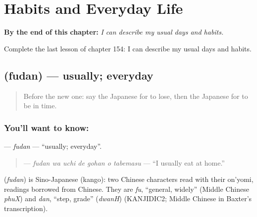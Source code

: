 
\chapter{Habits and Everyday Life}
\label{ch:ja-habits-and-everyday-life}

\begin{chapteropening}
\textbf{By the end of this chapter:} \emph{I can describe my usual days and habits.}

Complete the last lesson of chapter 154: I can describe my usual days and habits.
\end{chapteropening}

\section[\texorpdfstring{\ja{ふだん} (fudan)}{ふだん (fudan)}]{ (fudan) — usually; everyday}

\label{lesson:JA-C154-fudan}



\begin{quote}
Before the new one: say the Japanese for to lose, then the Japanese for to be in time.
\end{quote}

\subsection*{You'll want to know: }
\textbf{} — \emph{fudan} — \textquotedblleft{}usually; everyday\textquotedblright{}.

\begin{quote}
\textbf{   } — \emph{fudan wa uchi de gohan o tabemasu} — \textquotedblleft{}I usually eat at home.\textquotedblright{}
\end{quote}

\begin{cousinweb}
\textbf{} (\emph{fudan}) is Sino-Japanese (kango): two Chinese characters read with their on'yomi, readings borrowed from Chinese. They are \emph{fu}, \textquotedblleft{}general, widely\textquotedblright{} (Middle Chinese \emph{phuX}) and \emph{dan}, \textquotedblleft{}step, grade\textquotedblright{} (\emph{dwanH}) (KANJIDIC2; Middle Chinese in Baxter's transcription).
\end{cousinweb}

